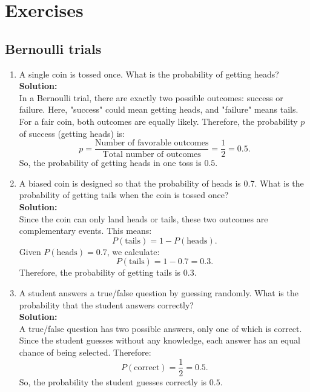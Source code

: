 \documentclass{book}
\begin{document}
\newpage

\section*{Exercises}

\subsection*{Bernoulli trials}

\begin{enumerate}

    \item A single coin is tossed once. What is the probability of getting heads? \\
    
    \textbf{Solution:} \\
    
    In a Bernoulli trial, there are exactly two possible outcomes: success or failure. Here, "success" could mean getting heads, and "failure" means tails. For a fair coin, both outcomes are equally likely. Therefore, the probability \(p\) of success (getting heads) is:
    \[
    p = \frac{\text{Number of favorable outcomes}}{\text{Total number of outcomes}} = \frac{1}{2} = 0.5.
    \]
    So, the probability of getting heads in one toss is \(\boxed{0.5}\).

    \item A biased coin is designed so that the probability of heads is 0.7. What is the probability of getting tails when the coin is tossed once? \\
    
    \textbf{Solution:} \\
    
    Since the coin can only land heads or tails, these two outcomes are complementary events. This means:
    \[
    P(\text{tails}) = 1 - P(\text{heads}).
    \]
    Given \(P(\text{heads}) = 0.7\), we calculate:
    \[
    P(\text{tails}) = 1 - 0.7 = 0.3.
    \]
    Therefore, the probability of getting tails is \(\boxed{0.3}\).

    \item A student answers a true/false question by guessing randomly. What is the probability that the student answers correctly? \\
    
    \textbf{Solution:} \\
    
    A true/false question has two possible answers, only one of which is correct. Since the student guesses without any knowledge, each answer has an equal chance of being selected. Therefore:
    \[
    P(\text{correct}) = \frac{1}{2} = 0.5.
    \]
    So, the probability the student guesses correctly is \(\boxed{0.5}\).
    
\end{enumerate}
\end{document}
